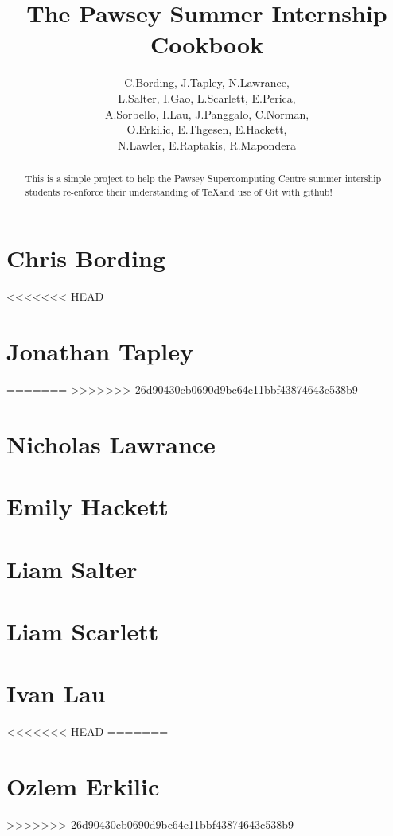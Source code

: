 \documentclass[11pt,a4paper]{report}
\title{The Pawsey Summer Internship Cookbook}
\author{C.Bording, J.Tapley, N.Lawrance,\\
L.Salter, I.Gao, L.Scarlett, E.Perica,\\
A.Sorbello, I.Lau, J.Panggalo, C.Norman,\\
O.Erkilic, E.Thgesen, E.Hackett,\\
N.Lawler, E.Raptakis, R.Mapondera}
\begin{document}
\maketitle
\tableofcontents


\begin{abstract}

This is a simple project to help the Pawsey Supercomputing Centre summer intership students re-enforce their understanding of \TeX and use of Git with github!

\end{abstract}

\chapter{Chris Bording}



<<<<<<< HEAD
\chapter{Jonathan Tapley}

=======
>>>>>>> 26d90430cb0690d9bc64c11bbf43874643c538b9

\chapter{Nicholas Lawrance}


\chapter{Emily Hackett}


\chapter{Liam Salter}


\chapter{Liam Scarlett}


\chapter{Ivan Lau}


<<<<<<< HEAD
=======
\chapter{Ozlem Erkilic}


>>>>>>> 26d90430cb0690d9bc64c11bbf43874643c538b9
\end{document}
